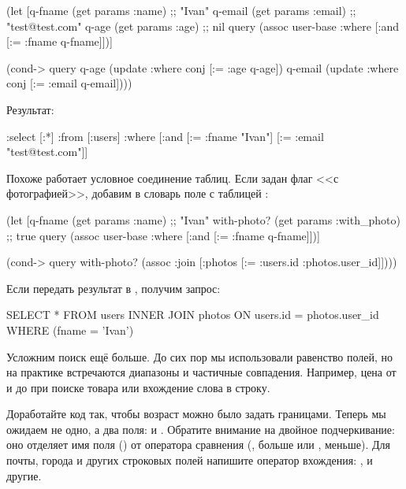 \begin{english}
  \begin{clojure}
(let [q-fname (get params :name)  ;; "Ivan"
      q-email (get params :email) ;; "test@test.com"
      q-age   (get params :age)   ;; nil
      query
      (assoc user-base
             :where [:and [:= :fname q-fname]])]

  (cond-> query
    q-age
    (update :where conj [:= :age q-age])
    q-email
    (update :where conj [:= :email q-email])))
  \end{clojure}
\end{english}

Результат:

\begin{english}
  \begin{clojure}
{:select [:*]
 :from [:users]
 :where [:and
         [:= :fname "Ivan"]
         [:= :email "test@test.com"]]}
  \end{clojure}
\end{english}

Похоже работает условное соединение таблиц. Если задан флаг <<с фотографией>>, добавим в словарь поле  с таблицей :

\begin{english}
  \begin{clojure}
(let [q-fname (get params :name)           ;; "Ivan"
      with-photo? (get params :with_photo) ;; true
      query
      (assoc user-base
             :where [:and [:= :fname q-fname]])]

  (cond-> query
    with-photo?
    (assoc :join
           [:photos [:= :users.id :photos.user_id]])))
  \end{clojure}
\end{english}

Если передать результат в , получим запрос:

\begin{english}
  \begin{sql}
SELECT * FROM users
INNER JOIN photos ON users.id = photos.user_id
WHERE (fname = 'Ivan')
  \end{sql}
\end{english}

Усложним поиск ещё больше. До сих пор мы использовали равенство полей, но на практике встречаются диапазоны и частичные совпадения. Например, цена от и до при поиске товара или вхождение слова в строку.

Доработайте код так, чтобы возраст можно было задать границами. Теперь мы ожидаем не одно, а два поля:  и . Обратите внимание на двойное подчеркивание: оно отделяет имя поля () от оператора сравнения (, больше или , меньше). Для почты, города и других строковых полей напишите оператор вхождения: ,  и другие.

